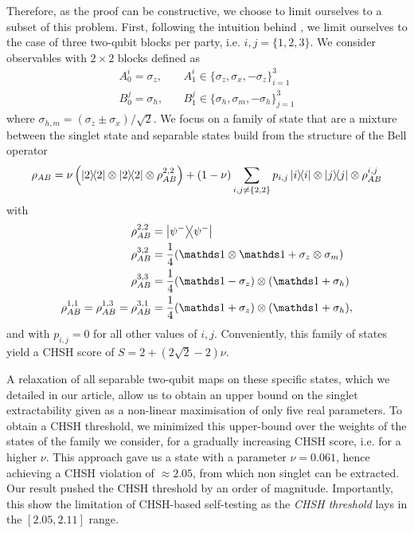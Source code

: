 Therefore, as the proof can be constructive, we choose to limit ourselves to a subset of this problem.
First, following the intuition behind \cite{Coopmans19}, we limit ourselves to the case of three two-qubit blocks per party, i.e. $i,j=\{1,2,3\}$.
We consider observables with $2 \times 2$ blocks defined as 
\begin{equation}
	\begin{split}
		A_0^i = \sigma_z, &\quad A_1^i \in \{\sigma_z,\sigma_x,-\sigma_z\}_{i=1}^3  \\
		B_0^j = \sigma_h, &\quad B_1^j \in \{\sigma_h,\sigma_m,-\sigma_h\}_{j=1}^3 
	\end{split}
\end{equation}
where $\sigma_{h,m} = (\sigma_z\pm\sigma_x)/\sqrt{2}$.
We focus on a family of state that are a mixture between the singlet state and separable states build from the structure of the Bell operator
\begin{equation}
	\rho_{AB} = \nu \left(\ketbra{2} \otimes \ketbra{2} \otimes \rho_{AB}^{2,2}\right) 
	+ (1-\nu) \sum_{i,j \neq \{2,2\}} p_{i,j} \ketbra{i} \otimes \ketbra{j} \otimes \rho_{AB}^{i,j}
\end{equation}
with 
\begin{equation}
	\begin{split}
    \rho_{AB}^{2,2}&=\ketbra{\psi^-} \\
    \rho_{AB}^{3,2}&= \frac{1}{4}(\id\otimes \id +\sigma_z\otimes \sigma_m)\\
    \rho_{AB}^{3,3}&= \frac{1}{4}(\id-\sigma_z)\otimes(\id+\sigma_h)\\
    \rho_{AB}^{1,1}=\rho_{AB}^{1,3}=\rho_{AB}^{3,1} &= \frac{1}{4}(\id+\sigma_z)\otimes(\id+\sigma_h),
	\end{split}	
	\label{eq:}
\end{equation}
and with $p_{i,j} =0$ for all other values of $i,j$.
Conveniently, this family of states yield a CHSH score of $S=2+(2\sqrt{2}-2)\nu$.

A relaxation of all separable two-qubit maps on these specific states, which we detailed in our article, allow us to obtain an upper bound on the singlet extractability given as a non-linear maximisation of only five real parameters.
To obtain a CHSH threshold, we minimized this upper-bound over the weights of the states of the family we consider, for a gradually increasing CHSH score, i.e. for a higher $\nu$.
This approach gave us a state with a parameter $\nu=0.061$, hence achieving a CHSH violation of $\approx 2.05$, from which non singlet can be extracted.
Our result pushed the CHSH threshold by an order of magnitude.
Importantly, this show the limitation of CHSH-based self-testing as the \textit{CHSH threshold} lays in the $[2.05,2.11]$ range.


